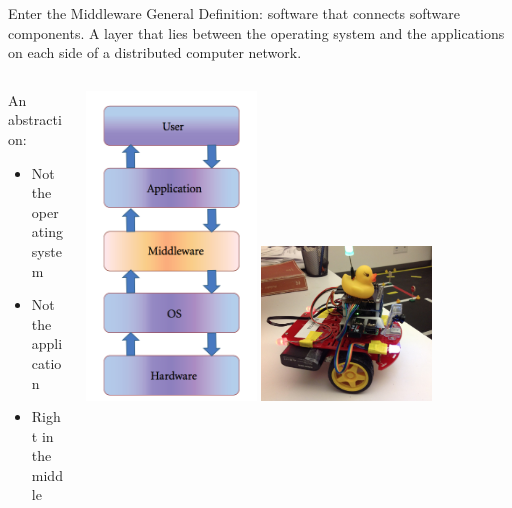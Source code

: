 \documentclass[aspectratio=43]{beamer}
\begin{document}
\begin{frame}{Enter the Middleware}
General Definition: software that connects software components. A layer that lies between the operating system and the applications on each side of a distributed computer network.
\begin{columns}
	\begin{column}{0.55\textwidth}
An abstraction:
		\begin{itemize}
			\item Not the operating system
                        \item Not the application
                        \item Right in the middle
		\end{itemize} 
        \end{column} 
        \begin{column}{0.45\textwidth} 
          \centering 
          \includegraphics[width=0.4\textwidth]{fig/layers.png} 
          \centering 
          \includegraphics[width=0.4\textwidth]{fig/mercedes.jpg} 

        \end{column}
\end{columns}

\end{frame}
\end{document}
